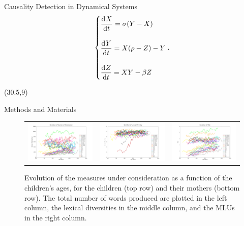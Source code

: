 \documentclass[final]{beamer}
\begin{document}
\begin{frame}{}
\begin{textblock}{28}
\begin{block}{Causality Detection in Dynamical Systems}
\small
\begin{equation}
\begin{dcases}
\dod{X}{t} = \sigma ( Y - X ) \\[10pt]
\dod{Y}{t} = X (\rho - Z) - Y \\[10pt]
\dod{Z}{t} = X Y - \beta Z 
\end{dcases}.
\label{eq:lorenz}
\end{equation}
\normalsize 
\end{block}
\end{textblock}

\begin{textblock}{28}(30.5,9)
\begin{block}{Methods and Materials}
\begin{figure}
\begin{tabular}{ccc}
\includegraphics[width=.325\textwidth]{nwords_evolution.png} &
\includegraphics[width=.325\textwidth]{lexical_evolution.png} &
\includegraphics[width=.325\textwidth]{syntactic_evolution.png}
\end{tabular}
\caption{Evolution of the measures under consideration as a function of the children's ages, for the children (top row) and their mothers (bottom row). The total number of words produced are plotted in the left column, the lexical diversities in the middle column, and the MLUs in the right column.}
\label{fig:evolution}
\end{figure}
\end{block}


\end{textblock}
\end{frame}
\end{document}
